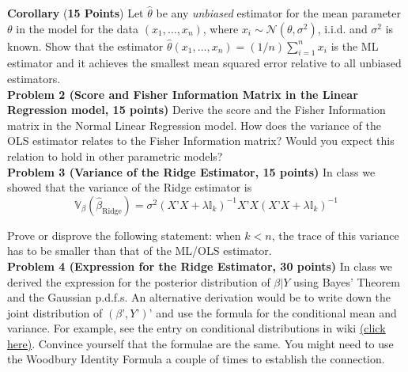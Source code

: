 \documentclass[11pt]{article} %
\begin{document}
\noindent \textbf{Corollary} (\textbf{15 Points}) Let $\widehat{\theta}$ be any \emph{unbiased} estimator for the mean parameter $\theta$ in the model for the data $(x_1,\ldots, x_n)$, where $x_i \sim \mathcal{N}(\theta, \sigma^2)$, i.i.d. and $\sigma^2$ is known. Show that the estimator
$\widehat{\theta}(x_1, \ldots, x_n) = (1/n) \sum_{i=1}^{n} x_i$
\noindent is the ML estimator and it achieves the smallest mean squared error relative to all unbiased estimators. \\

\noindent \textbf{Problem 2 (Score and Fisher Information Matrix in the Linear Regression model, 15 points)} Derive the score and the Fisher Information matrix in the Normal Linear Regression model. How does the variance of the OLS estimator relates to the Fisher Information matrix? Would you expect this relation to hold in other parametric models? \\

\noindent \textbf{Problem 3 (Variance of the Ridge Estimator, 15 points)} In class we showed that the variance of the Ridge estimator is
\[ \mathbb{V}_{\beta} (\widehat{\beta}_{\textrm{Ridge}}) = \sigma^2( X’X + \lambda \mathbb{I}_k)^{-1} X’X ( X’X + \lambda \mathbb{I}_k)^{-1}  \]

\noindent Prove or disprove the following statement: when $k<n$, the trace of this variance has to be smaller than that of the ML/OLS estimator. \\

\noindent \textbf{Problem 4 (Expression for the Ridge Estimator, 30 points) } In class we derived the expression for the posterior distribution of $\beta | Y$ using Bayes’ Theorem and the Gaussian p.d.f.s. An alternative derivation would be to write down the joint distribution of $(\beta’, Y’)’$ and use the formula for the conditional mean and variance. For example, see the entry on conditional distributions in wiki \href{https://en.wikipedia.org/wiki/Multivariate_normal_distribution#Conditional_distributions}{(click here)}.  Convince yourself that the formulae are the same. You might need to use the Woodbury Identity Formula a couple of times to establish the connection. 


\newpage



\end{document}
